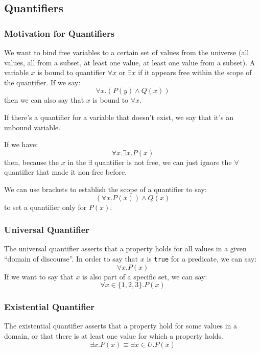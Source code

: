 \subsection{Quantifiers}\label{sub:quantifiers}

\subsubsection{Motivation for Quantifiers}\label{ssub:motivation_for_quantifiers}

We want to bind free variables to a certain set of values from the universe (all values, all from a subset, at least one value, at least one value from a subset).
A variable \(x\) is bound to quantifier \(\forall x\) or \(\exists x\) if it appears free within the scope of the quantifier.
If we say:
\[
    \forall x . \left( P(y) \land Q(x) \right)
\]
then we can also say that \(x\) is bound to \(\forall x\).
\begin{note}
    If there's a quantifier for a variable that doesn't exist, we say that it's an unbound variable.
\end{note}
If we have:
\[
    \forall x . \exists x . P(x)
\]
then, because the \(x\) in the \(\exists\) quantifier is not free, we can just ignore the \(\forall\) quantifier that made it non-free before.
\begin{note}
    We can use brackets to establish the scope of a quantifier to say:
    \[
        \left( \forall x . P(x) \right) \land Q(x)
    \]
    to set a quantifier only for \(P(x)\).
\end{note}

\subsubsection{Universal Quantifier}\label{ssub:universal_quantifier}

The universal quantifier asserts that a property holds for all values in a given ``domain of discourse''.
In order to say that \(x\) is \texttt{true} for a predicate, we can say:
\[
    \forall x . P(x)
\]
If we want to say that \(x\) is also part of a specific set, we can say:
\[
    \forall x \in \{1, 2, 3\} . P(x)
\]

\subsubsection{Existential Quantifier}\label{ssub:existential_quantifier}

The existential quantifier asserts that a property hold for some values in a domain, or that there is at least one value for which a property holds.
\[
    \exists x . P(x) \equiv \exists x \in U . P(x)
\]

